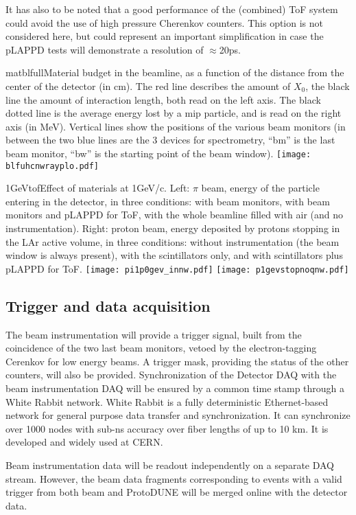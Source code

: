 It has also to be noted that a good performance of the (combined) ToF system could avoid the use of high pressure  Cherenkov counters. This option is not considered here, but could
represent an important simplification  in case the pLAPPD tests will demonstrate a resolution of $\approx$20ps.
 \begin{cdrfigure}{matblfull}{Material budget in the beamline, as a function of the distance from the center of the detector (in cm). The red line describes the amount of $X_0$, the black line the amount of interaction length, both read on the left axis. The black dotted line is the average energy lost by a mip particle, and is read on the right axis (in MeV). Vertical lines show the positions of the various beam monitors (in between the two blue lines are the 3 devices for spectrometry, ``bm'' is the last beam monitor, ``bw'' is the starting point of the beam window).}  
\texttt{[image: blfuhcnwrayplo.pdf]}
\end{cdrfigure}
%
 \begin{cdrfigure}{1GeVtof}{Effect of materials at  1GeV/c. Left: $\pi$ beam, energy of the particle entering in the detector, in three conditions: with  beam monitors, with beam monitors and pLAPPD for ToF, with the whole beamline filled with air (and no instrumentation). Right: proton beam, energy deposited by protons stopping in the LAr active volume, in three conditions: without instrumentation (the beam window is always present), with the scintillators only, and with scintillators plus pLAPPD for ToF.}
\texttt{[image: pi1p0gev\_innw.pdf]}
\texttt{[image: p1gevstopnoqnw.pdf]}
\end{cdrfigure}



\subsection {Trigger and data acquisition}
The beam instrumentation will provide a trigger signal, built from the coincidence of the two last beam monitors, vetoed by the electron-tagging Cerenkov for low energy beams. A trigger mask, providing the status of the other counters, will also be provided. 
 Synchronization of the Detector DAQ with the beam instrumentation DAQ will be ensured by a common time stamp through a White Rabbit network.
 White Rabbit is a fully deterministic Ethernet-based network for general purpose data transfer and synchronization. It can synchronize over 1000 nodes with sub-ns accuracy over fiber lengths of up to 10 km. It is developed and widely used at CERN.

Beam instrumentation data will be readout independently on a separate DAQ stream. However,  
the beam data fragments corresponding to  events with a valid trigger from both beam and ProtoDUNE will be merged online with the detector data.
 
